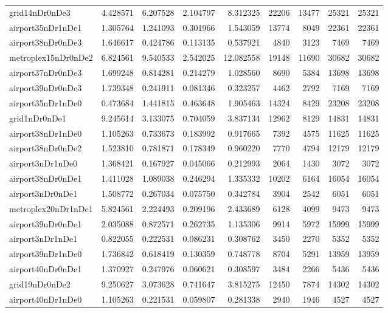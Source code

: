 \begin{longtable}{|l|r|r|r|r|r|r|r|r|}
grid14nDr0nDe3 & 4.428571 & 6.207528 & 2.104797 & 8.312325 & 22206 & 13477 & 25321 & 25321 \\
airport35nDr1nDe1 & 1.305764 & 1.241093 & 0.301966 & 1.543059 & 13774 & 8049 & 22361 & 22361 \\
airport38nDr0nDe3 & 1.646617 & 0.424786 & 0.113135 & 0.537921 & 4840 & 3123 & 7469 & 7469 \\
metroplex15nDr0nDe2 & 6.824561 & 9.540533 & 2.542025 & 12.082558 & 19148 & 11690 & 30682 & 30682 \\
airport37nDr0nDe3 & 1.699248 & 0.814281 & 0.214279 & 1.028560 & 8690 & 5384 & 13698 & 13698 \\
airport39nDr0nDe3 & 1.739348 & 0.241911 & 0.081346 & 0.323257 & 4462 & 2792 & 7169 & 7169 \\
airport35nDr1nDe0 & 0.473684 & 1.441815 & 0.463648 & 1.905463 & 14324 & 8429 & 23208 & 23208 \\
grid1nDr0nDe1 & 9.245614 & 3.133075 & 0.704059 & 3.837134 & 12962 & 8129 & 14831 & 14831 \\
airport38nDr1nDe0 & 1.105263 & 0.733673 & 0.183992 & 0.917665 & 7392 & 4575 & 11625 & 11625 \\
airport38nDr0nDe2 & 1.523810 & 0.781871 & 0.178349 & 0.960220 & 7770 & 4794 & 12179 & 12179 \\
airport3nDr1nDe0 & 1.368421 & 0.167927 & 0.045066 & 0.212993 & 2064 & 1430 & 3072 & 3072 \\
airport38nDr0nDe1 & 1.411028 & 1.089038 & 0.246294 & 1.335332 & 10202 & 6164 & 16054 & 16054 \\
airport3nDr0nDe1 & 1.508772 & 0.267034 & 0.075750 & 0.342784 & 3904 & 2542 & 6051 & 6051 \\
metroplex20nDr1nDe1 & 5.824561 & 2.224493 & 0.209196 & 2.433689 & 6128 & 4099 & 9473 & 9473 \\
airport39nDr0nDe1 & 2.035088 & 0.872571 & 0.262735 & 1.135306 & 9914 & 5972 & 15999 & 15999 \\
airport3nDr1nDe1 & 0.822055 & 0.222531 & 0.086231 & 0.308762 & 3450 & 2270 & 5352 & 5352 \\
airport39nDr1nDe0 & 1.736842 & 0.618419 & 0.130359 & 0.748778 & 8704 & 5291 & 13959 & 13959 \\
airport40nDr0nDe1 & 1.370927 & 0.247976 & 0.060621 & 0.308597 & 3484 & 2266 & 5436 & 5436 \\
grid19nDr0nDe2 & 9.250627 & 3.073628 & 0.741647 & 3.815275 & 12450 & 7874 & 14302 & 14302 \\
airport40nDr1nDe0 & 1.105263 & 0.221531 & 0.059807 & 0.281338 & 2940 & 1946 & 4527 & 4527 \\

\end{longtable}
